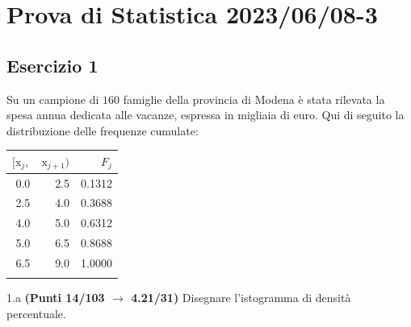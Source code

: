 \documentclass[
  11pt,
]{book}
\theoremstyle{mytheoremstyle}
\theoremstyle{mydefstyle}
\begin{document}
\section{Prova di Statistica 2023/06/08-3}\label{prova-di-statistica-20230608-3}

\subsection{Esercizio 1}\label{esercizio-1-28}

Su un campione di \(160\) famiglie della provincia di Modena è stata rilevata la spesa annua dedicata alle vacanze, espressa in migliaia di euro. Qui di seguito la distribuzione delle frequenze cumulate:

\begin{table}[H]
\centering
\begin{tabular}{rrr}
\toprule
$[\text{x}_j,$ & $\text{x}_{j+1})$ & $F_j$\\
\midrule
0.0 & 2.5 & 0.1312\\
2.5 & 4.0 & 0.3688\\
4.0 & 5.0 & 0.6312\\
5.0 & 6.5 & 0.8688\\
6.5 & 9.0 & 1.0000\\
 &  & \\
\bottomrule
\end{tabular}
\end{table}

1.a \textbf{(Punti 14/103 \(\rightarrow\) 4.21/31)} Disegnare l'istogramma di densità percentuale.
\end{document}
